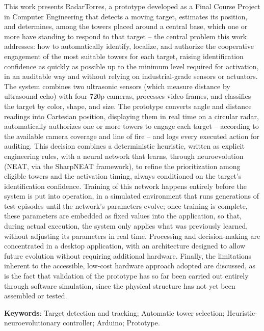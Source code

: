 \documentclass[12pt,a4paper]{article}
\begin{document}
\noindent This work presents RadarTorres, a prototype developed as a Final Course Project in
Computer Engineering that detects a moving target, estimates its position, and determines, among
the towers placed around a central base, which one or more have standing to respond to that
target -- the central problem this work addresses: how to automatically identify, localize, and
authorize the cooperative engagement of the most suitable towers for each target, raising
identification confidence as quickly as possible up to the minimum level required for activation,
in an auditable way and without relying on industrial-grade sensors or actuators. The system
combines two ultrasonic sensors (which measure distance by ultrasound echo) with four 720p
cameras, processes video frames, and classifies the target by color, shape, and size. The
prototype converts angle and distance readings into Cartesian position, displaying them in real
time on a circular radar, automatically authorizes one or more towers to engage each target --
according to the available camera coverage and line of fire -- and logs every executed action for
auditing. This decision combines a deterministic heuristic, written as explicit engineering rules,
with a neural network that learns, through neuroevolution (NEAT, via the SharpNEAT framework), to
refine the prioritization among eligible towers and the activation timing, always conditioned on
the target's identification confidence.
Training of this network happens entirely before the system is put into operation, in a simulated
environment that runs generations of test episodes until the network's parameters evolve; once
training is complete, these parameters are embedded as fixed values into the application, so
that, during actual execution, the system only applies what was previously learned, without
adjusting its parameters in real time. Processing and decision-making are concentrated in a
desktop application, with an architecture designed to allow future evolution without requiring
additional hardware. Finally, the limitations inherent to the accessible, low-cost hardware
approach adopted are discussed, as is the fact that validation of the prototype has so far been
carried out entirely through software simulation, since the physical structure has not yet been
assembled or tested.

\noindent\textbf{Keywords}: Target detection and tracking; Automatic tower selection; Heuristic-neuroevolutionary controller; Arduino; Prototype.

\clearpage
\end{document}
